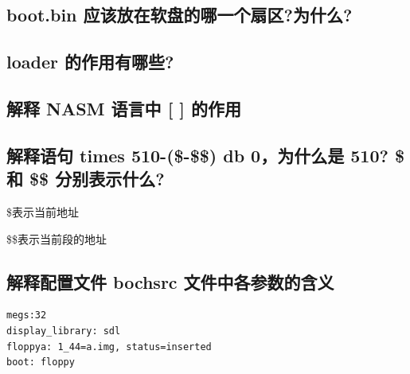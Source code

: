 \documentclass{article}
\begin{document}
\subsection{boot.bin 应该放在软盘的哪一个扇区?为什么?}
\subsection{loader 的作用有哪些?}
\subsection{解释 NASM 语言中 [ ] 的作用}
\subsection{解释语句 times 510-(\$-\$\$) db 0，为什么是 510? \$ 和 \$\$ 分别表示什么?}
\$表示当前地址

\$\$表示当前段的地址
\subsection{解释配置文件 bochsrc 文件中各参数的含义}
\begin{lstlisting}
megs:32
display_library: sdl
floppya: 1_44=a.img, status=inserted 
boot: floppy
\end{lstlisting}
\end{document}
